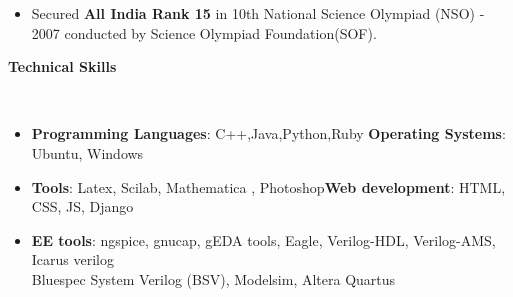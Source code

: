 \documentclass[a4paper,11pt]{article}
\newcommand{\lsep}{-0.5cm}
\newcommand{\resheading}[1]{{\small \colorbox{mygrey}{\begin{minipage}{0.975\textwidth}{\textbf{#1 \vphantom{p\^{E}}}}\end{minipage}}}}
\begin{document}
\begin{itemize}
  \item Secured \textbf{All India Rank 15} in 10th National Science Olympiad (NSO) - 2007 conducted by Science Olympiad Foundation(SOF).
\end{itemize}

\resheading{\textbf{\large Technical Skills}}\\[\lsep]
\begin{itemize}
   \item \textbf{Programming Languages}: C++,Java,Python,Ruby \hfill \textbf{Operating Systems}: Ubuntu, Windows\\[-0.6cm]
  \item \textbf{Tools}: Latex, Scilab, Mathematica , Photoshop\hfill \textbf{Web development}: HTML, CSS, JS, Django\\[-0.6cm]
  \item \textbf{EE tools}: ngspice, gnucap,  gEDA tools, Eagle, Verilog-HDL, Verilog-AMS, Icarus verilog \\ \hspace*{1.5cm} Bluespec System Verilog (BSV), Modelsim, Altera Quartus
\end{itemize}
\end{document}
